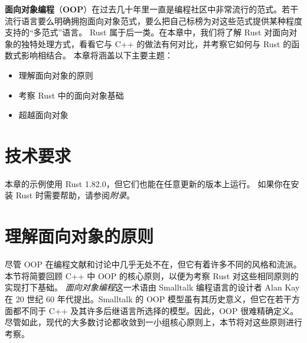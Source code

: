 \label{idx:idx_58ed3d7c}
\textbf{面向对象编程}（\textbf{OOP}）在过去几十年里一直是编程社区中非常流行的范式。若干流行语言要么明确拥抱面向对象范式，要么把自己标榜为对这些范式提供某种程度支持的“多范式”语言。
Rust 属于后一类。在本章中，我们将了解 Rust 对面向对象的独特处理方式，看看它与 C++ 的做法有何对比，并考察它如何与 Rust 的函数式影响相结合。
本章将涵盖以下主要主题：
\begin{itemize}
  \item 理解面向对象的原则
  \item 考察 Rust 中的面向对象基础
  \item 超越面向对象
\end{itemize}
\section{技术要求}
本章的示例使用 Rust 1.\allowbreak{}82.\allowbreak{}0，但它们也能在任意更新的版本上运行。
如果你在安装 Rust 时需要帮助，请参阅\emph{附录}。
\section{理解面向对象的原则}
\label{idx:idx_745a6309}
尽管 OOP 在编程文献和讨论中几乎无处不在，但它有着许多不同的风格和流派。本节将简要回顾 C++ 中 OOP 的核心原则，以便为考察 Rust 对这些相同原则的实现打下基础。
\emph{面向对象编程}这一术语由 Smalltalk 编程语言的设计者 Alan Kay 在 20 世纪 60 年代提出。Smalltalk 的 OOP 模型虽有其历史意义，但它在若干方面都不同于 C++ 及其许多后继语言所选择的模型。因此，OOP 很难精确定义。尽管如此，现代的大多数讨论都收敛到一小组核心原则上，本节将对这些原则进行考察。
